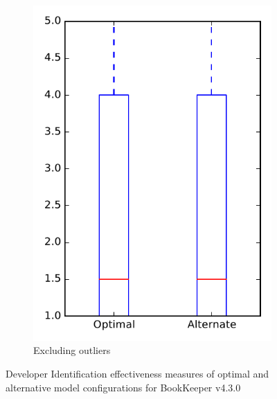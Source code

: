 \begin{figure}
\begin{subfigure}{.4\textwidth}
        \includegraphics[height=0.4\textheight]{figures/combo/dit_rq1_bookkeeper_no_outlier}
        \caption{Excluding outliers}\label{fig:combo:dit:rq1:bookkeeper_no_outlier}
    \end{subfigure}
\caption{Developer Identification effectiveness measures of optimal and alternative model configurations for BookKeeper v4.3.0}
\label{fig:combo:dit:rq1:bookkeeper}
\end{figure}
